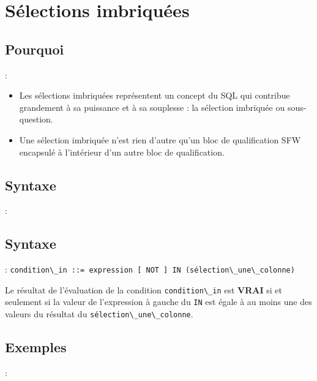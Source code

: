 \documentclass[10pt]{beamer}
\begin{document}
\section{Sélections imbriquées}
\subsection{Pourquoi}
\begin{frame}{\secname : \subsecname}
    \begin{itemize}
        \item Les sélections imbriquées représentent un concept du SQL qui contribue grandement à sa puissance et à sa souplesse : la sélection imbriquée ou sous-question.
        \item Une sélection imbriquée n'est rien d'autre qu'un bloc de qualification SFW encapsulé à l'intérieur d'un autre bloc de qualification.
    \end{itemize}
\end{frame}

\subsection{Syntaxe}
\begin{frame}{\secname : \subsecname}
    
\end{frame}

\subsection{Syntaxe}
\begin{frame}{\secname : \subsecname}
    \lstinline[language=bnf]!condition\_in ::= expression [ NOT ] IN (sélection\_une\_colonne)!
    \newline

    Le résultat de l'évaluation de la condition \lstinline[language=bnf]!condition\_in! est \textbf{VRAI} si et seulement si la valeur de l'expression à gauche du \lstinline[language=plsql]!IN! est égale à au moins une des valeurs du résultat du \lstinline[language=bnf]!sélection\_une\_colonne!.
\end{frame}

\subsection{Exemples}
\begin{frame}{\secname : \subsecname}
    
\end{frame}
\end{document}
